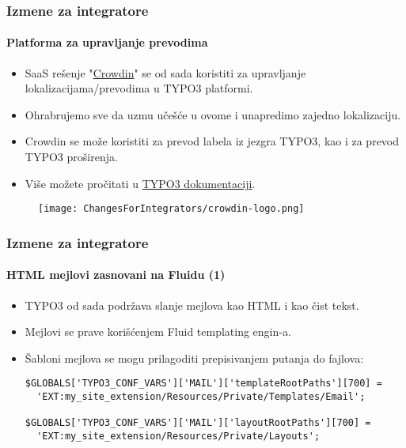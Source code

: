 
\begin{frame}[fragile]
	\frametitle{Izmene za integratore}
	\framesubtitle{Platforma za upravljanje prevodima}

	\begin{itemize}
		\item SaaS rešenje "\href{https://crowdin.com/}{Crowdin}" se od sada koristiti
			za upravljanje lokalizacijama/prevodima u TYPO3 platformi.
		\item Ohrabrujemo sve da uzmu učešće u ovome i unapredimo zajedno lokalizaciju.
		\item Crowdin se može koristiti za prevod labela iz jezgra TYPO3,
			kao i za prevod TYPO3 proširenja.
		\item Više možete pročitati u
			\href{https://docs.typo3.org/m/typo3/reference-coreapi/master/en-us/ApiOverview/Internationalization/TranslationServer/Crowdin.html}{TYPO3 dokumentaciji}.
	\end{itemize}

	\begin{figure}
		\texttt{[image: ChangesForIntegrators/crowdin-logo.png]}
	\end{figure}

\end{frame}


\begin{frame}[fragile]
	\frametitle{Izmene za integratore}
	\framesubtitle{HTML mejlovi zasnovani na Fluidu (1)}

	\lstset{basicstyle=\smaller\ttfamily}

	\begin{itemize}
		\item TYPO3 od sada podržava slanje mejlova kao HTML i kao čist tekst.
		\item Mejlovi se prave korišćenjem Fluid templating engin-a.
		\item Šabloni mejlova se mogu prilagoditi prepisivanjem putanja do fajlova:

\vspace{-0.4cm}
\begin{lstlisting}
$GLOBALS['TYPO3_CONF_VARS']['MAIL']['templateRootPaths'][700] =
  'EXT:my_site_extension/Resources/Private/Templates/Email';

$GLOBALS['TYPO3_CONF_VARS']['MAIL']['layoutRootPaths'][700] =
  'EXT:my_site_extension/Resources/Private/Layouts';
\end{lstlisting}

	\end{itemize}

\end{frame}

